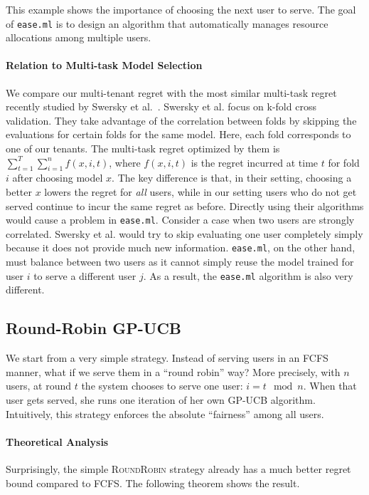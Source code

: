\documentclass[letterpaper]{vldb}
\newcommand{\eml}{\texttt{ease.ml}\xspace}
\newcommand{\rr}{\textsc{RoundRobin}\xspace}
\begin{document}
\vspace{0.5em}
This example shows the importance of
choosing the next user to serve. The goal of
\eml is to design an algorithm
that automatically manages resource
allocations among multiple users.

\vspace{-0.5em}
\paragraph*{Relation to 
Multi-task Model Selection}
We compare our multi-tenant
regret with the most similar multi-task
regret recently
studied by Swersky et al.~\cite{Swersky2013}.
Swersky et al. focus on 
k-fold cross validation. They 
take advantage of the correlation between
folds by skipping the evaluations for certain folds for the same model. Here, each fold corresponds to 
one of our tenants. The
multi-task regret optimized by them
is $\sum_{t=1}^T \sum_{i=1}^n f(x, i, t)$,
where $f(x, i, t)$ is the regret incurred
at time $t$ for fold $i$ after choosing
model $x$. The key difference
is that, in their setting, choosing a
better $x$ lowers the regret for {\em all}
users, while in our setting users
who do not get served continue to incur 
the same regret as before. 
Directly using their algorithms would 
cause a problem in \eml. Consider
a case when two users are strongly correlated. Swersky et al. would try to 
skip evaluating one user completely
simply because it does not provide much new information. \eml, on the other hand, must 
balance between two users as it cannot 
simply reuse the model trained 
for user $i$ to serve a different user $j$.
As a result, the \eml algorithm is also very different.

\subsection{Round-Robin GP-UCB}

We start from a very simple strategy. Instead of
serving users in an FCFS manner, what if
we serve them in a ``round robin'' way?
More precisely, with $n$ users, 
at round $t$ the system
chooses to serve one user: $i = t \mod n$.
When that user gets served, she runs one
iteration of her own GP-UCB algorithm. 
Intuitively, this strategy enforces
the absolute ``fairness'' among all users.

\vspace{-0.5em}
\paragraph*{Theoretical Analysis}
Surprisingly, the simple \rr strategy already
has a much better regret bound compared
to FCFS. The following theorem shows
the result. 
\end{document}
